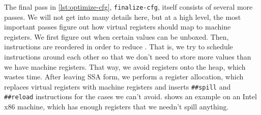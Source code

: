 
The final pass in \cref{lst:optimize-cfg}, \Verb|finalize-cfg|, itself
consists of several more passes.  We will not get into many details here, but
at a high level, the most important passes figure out how virtual registers
should map to machine registers.  We first figure out when certain values can
be unboxed.  Then, instructions are reordered in order to reduce .  That is, we try to schedule instructions around each other so that
we don't need to store more values than we have machine registers.  That way,
we avoid  registers onto the heap, which wastes time.  After
leaving \gls{SSA} form, we perform a  register allocation,
which replaces virtual registers with machine registers and inserts
\Verb|##spill| and \Verb|##reload| instructions for the cases we can't
avoid.   shows an example on an Intel x86 machine, which
has enough registers that we needn't spill anything.
